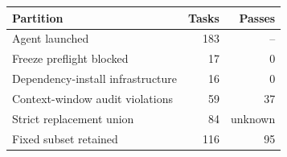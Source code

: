 \begin{tabular}{lrr}
\toprule
\textbf{Partition} & \textbf{Tasks} & \textbf{Passes} \\
\midrule
Agent launched & 183 & -- \\
Freeze preflight blocked & 17 & 0 \\
Dependency-install infrastructure & 16 & 0 \\
Context-window audit violations & 59 & 37 \\
Strict replacement union & 84 & unknown \\
Fixed subset retained & 116 & 95 \\
\bottomrule
\end{tabular}
